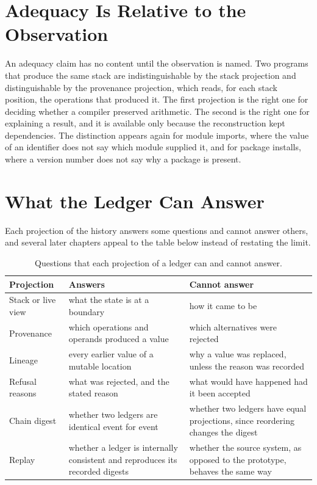 \documentclass[11pt,oneside]{report}
\theoremstyle{plain}
\theoremstyle{definition}
\theoremstyle{remark}
\begin{document}
\section{Adequacy Is Relative to the Observation}

An adequacy claim has no content until the observation is named. Two programs that produce the same stack are indistinguishable by the stack projection and distinguishable by the provenance projection, which reads, for each stack position, the operations that produced it. The first projection is the right one for deciding whether a compiler preserved arithmetic. The second is the right one for explaining a result, and it is available only because the reconstruction kept dependencies. The distinction appears again for module imports, where the value of an identifier does not say which module supplied it, and for package installs, where a version number does not say why a package is present.

\section{What the Ledger Can Answer}

Each projection of the history answers some questions and cannot answer others, and several later chapters appeal to the table below instead of restating the limit.

\begin{table}[H]
\centering
\begin{tabular}{p{2.9cm}p{4.7cm}p{5.2cm}}
\toprule
Projection & Answers & Cannot answer\\
\midrule
Stack or live view & what the state is at a boundary & how it came to be\\
Provenance & which operations and operands produced a value & which alternatives were rejected\\
Lineage & every earlier value of a mutable location & why a value was replaced, unless the reason was recorded\\
Refusal reasons & what was rejected, and the stated reason & what would have happened had it been accepted\\
Chain digest & whether two ledgers are identical event for event & whether two ledgers have equal projections, since reordering changes the digest\\
Replay & whether a ledger is internally consistent and reproduces its recorded digests & whether the source system, as opposed to the prototype, behaves the same way\\
\bottomrule
\end{tabular}
\caption{Questions that each projection of a ledger can and cannot answer.}
\end{table}
\end{document}
